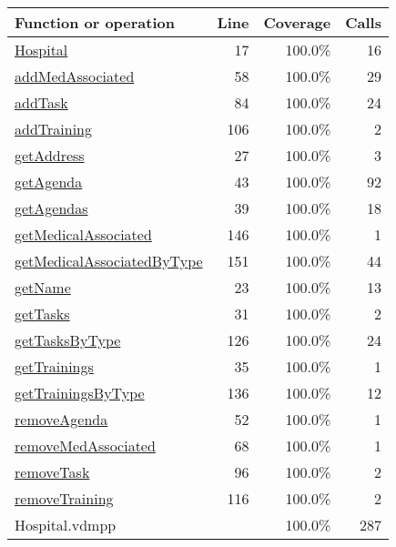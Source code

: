 \begin{longtable}{|l|r|r|r|}
\hline
Function or operation & Line & Coverage & Calls \\
\hline
\hline
\hyperref[Hospital:17]{Hospital} & 17&100.0\% & 16 \\
\hline
\hyperref[addMedAssociated:58]{addMedAssociated} & 58&100.0\% & 29 \\
\hline
\hyperref[addTask:84]{addTask} & 84&100.0\% & 24 \\
\hline
\hyperref[addTraining:106]{addTraining} & 106&100.0\% & 2 \\
\hline
\hyperref[getAddress:27]{getAddress} & 27&100.0\% & 3 \\
\hline
\hyperref[getAgenda:43]{getAgenda} & 43&100.0\% & 92 \\
\hline
\hyperref[getAgendas:39]{getAgendas} & 39&100.0\% & 18 \\
\hline
\hyperref[getMedicalAssociated:146]{getMedicalAssociated} & 146&100.0\% & 1 \\
\hline
\hyperref[getMedicalAssociatedByType:151]{getMedicalAssociatedByType} & 151&100.0\% & 44 \\
\hline
\hyperref[getName:23]{getName} & 23&100.0\% & 13 \\
\hline
\hyperref[getTasks:31]{getTasks} & 31&100.0\% & 2 \\
\hline
\hyperref[getTasksByType:126]{getTasksByType} & 126&100.0\% & 24 \\
\hline
\hyperref[getTrainings:35]{getTrainings} & 35&100.0\% & 1 \\
\hline
\hyperref[getTrainingsByType:136]{getTrainingsByType} & 136&100.0\% & 12 \\
\hline
\hyperref[removeAgenda:52]{removeAgenda} & 52&100.0\% & 1 \\
\hline
\hyperref[removeMedAssociated:68]{removeMedAssociated} & 68&100.0\% & 1 \\
\hline
\hyperref[removeTask:96]{removeTask} & 96&100.0\% & 2 \\
\hline
\hyperref[removeTraining:116]{removeTraining} & 116&100.0\% & 2 \\
\hline
\hline
Hospital.vdmpp & & 100.0\% & 287 \\
\hline
\end{longtable}

